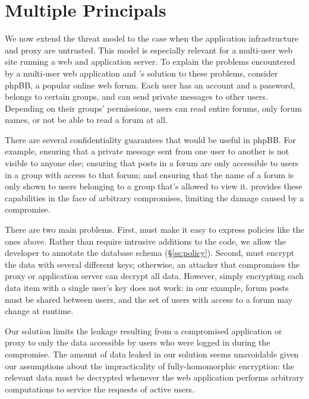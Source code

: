 
\section{Multiple Principals}
\label{s:multi}
\label{sec:multi}

We now extend the threat model to the case when the application
infrastructure and proxy are untrusted.  This model is especially
relevant for a multi-user web site running a web and application
server.  To explain the problems encountered by a multi-user web
application and \name{}'s solution to these problems, consider phpBB,
a popular online web forum.  Each user has an account and a password,
belongs to certain groups, and can send private messages to other
users. Depending on their groups' permissions, users can read entire
forums, only forum names, or not be able to read a forum at all.

There are several confidentiality guarantees that would be useful
in phpBB\@.  For example, ensuring that a private message sent from
one user to another is not visible to anyone else; ensuring that
posts in a forum are only accessible to users in a group with access
to that forum; and ensuring that the name of a forum is only shown
to users belonging to a group that's allowed to view it.  \name{}
provides these capabilities in the face of arbitrary compromises,
limiting the damage caused by a compromise.

There are two main problems.  First, \name must make it easy to
express policies like the ones above.  Rather than require intrusive
additions to the code, we allow the developer to annotate the database
schema (\S\ref{ss:policy}).  Second, \name must encrypt the data with
several different keys; otherwise, an attacker that compromises the
proxy or application server can decrypt all data.  However, simply
encrypting each data item with a single user's key does not work: in
our example, forum posts must be shared between users, and the set of
users with access to a forum may change at runtime.

Our solution limits the leakage resulting from a compromised
application or proxy to only the data accessible by users who were
logged in during the compromise.  The amount of data leaked
in our solution seems unavoidable given our assumptions about the
impracticality of fully-homomorphic encryption: the relevant data
must be decrypted whenever the web application performs arbitrary
computations to service the requests of active users.

